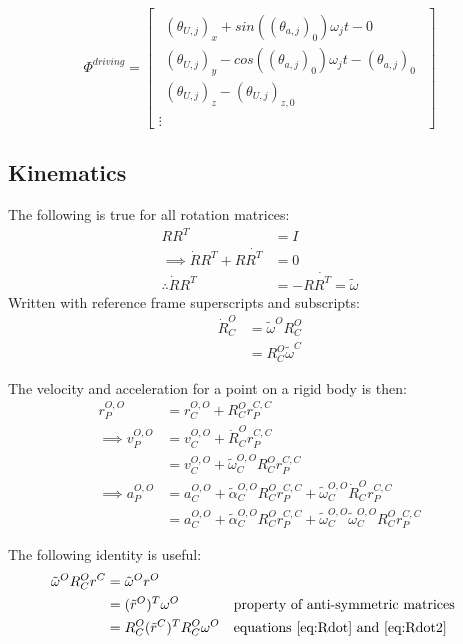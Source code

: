\begin{equation}
    \Phi^{driving}=
    \begin{bmatrix}
    \begin{array}{l} %
    (\theta_{U,j})_x + sin((\theta_{a,j})_0)\omega_j t - 0\\
    (\theta_{U,j})_y - cos((\theta_{a,j})_0)\omega_j t - (\theta_{a,j})_0 \\
    (\theta_{U,j})_z - (\theta_{U,j})_{z,0}
    \end{array}\\
    \vdots
    \end{bmatrix}
\end{equation}

\subsection{Kinematics}
The following is true for all rotation matrices:
\begin{align}
RR^T&=I \\
\implies \dot{R}R^T+R\dot{R^T}&=0 \nonumber\\
\therefore \dot{R}R^T&=-R\dot{R^T}=\tilde{\omega} \label{eq:omega}
\end{align}
Written with reference frame superscripts and subscripts:
\begin{align}
       \dot{R}^O_C &=\tilde{\omega}^O R^O_C \label{eq:Rdot} \\
             &= R^O_C \tilde{\omega}^C \label{eq:Rdot2}
\end{align}

The velocity and acceleration for a point on a rigid body is then:
\begin{align}
r_P^{O,O}&=r_C^{O,O}+R^O_C r_P^{C,C} \\
\implies v_P^{O,O}&=v_C^{O,O}+\dot{R}^O_C r_P^{C,C} \nonumber\\
                 &=v_C^{O,O}+\tilde{\omega}^{O,O}_C R^O_C r_P^{C,C}  \label{eq:Vel3D}\\
\implies a_P^{O,O}&=a_C^{O,O}+\tilde{\alpha}^{O,O}_C R^O_C r_P^{C,C} + \tilde{\omega}^{O,O}_C \dot{R}^O_C r_P^{C,C} \nonumber \\
                  &=a_C^{O,O}+\tilde{\alpha}^{O,O}_C R^O_C r_P^{C,C} + \tilde{\omega}^{O,O}_C \tilde{\omega}^{O,O}_C R^O_C r_P^{C,C} \label{eq:Acc3D}
\end{align}

The following identity is useful:
\begin{align*}
\tilde{\omega}^O R^O_C r^C &= \tilde{\omega}^O r^O \\
                           &= (\tilde{r}^O)^T \omega^O   &&\text{property of anti-symmetric matrices} \\
                           &= R^O_C (\tilde{r}^C)^T R_C^O \omega^O &&\text{equations \ref{eq:Rdot} and \ref{eq:Rdot2}} 
\end{align*}

